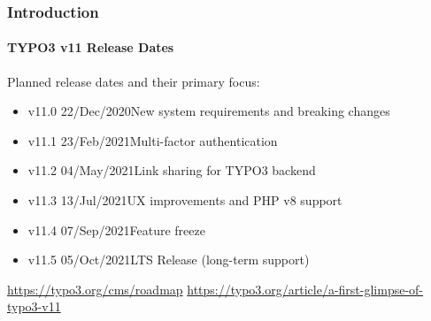 %

\begin{frame}[fragile]
	\frametitle{Introduction}
	\framesubtitle{TYPO3 v11 Release Dates}

	Planned release dates and their primary focus:

	\begin{itemize}
		\item v11.0 \tabto{1.1cm}22/Dec/2020\tabto{3.4cm}New system requirements and breaking changes
		\item v11.1 \tabto{1.1cm}23/Feb/2021\tabto{3.4cm}Multi-factor authentication
		\item v11.2 \tabto{1.1cm}04/May/2021\tabto{3.4cm}Link sharing for TYPO3 backend
		\item v11.3 \tabto{1.1cm}13/Jul/2021\tabto{3.4cm}UX improvements and PHP v8 support
		\item v11.4 \tabto{1.1cm}07/Sep/2021\tabto{3.4cm}Feature freeze
		\item
			\begingroup
				\color{typo3orange}
				v11.5 \tabto{1.1cm}05/Oct/2021\tabto{3.4cm}LTS Release (long-term support)
			\endgroup
	\end{itemize}

	\smaller
		\url{https://typo3.org/cms/roadmap}\newline
		\url{https://typo3.org/article/a-first-glimpse-of-typo3-v11}
	\normalsize

\end{frame}

